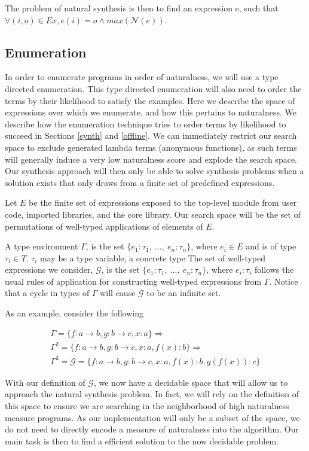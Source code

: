 The problem of natural synthesis is then to find an expression e, such that $\forall (i,o) \in Ex, e (i) = o \land max(\mathcal{N}(e))$.


\subsection{Enumeration}
In order to enumerate programs in order of naturalness, we will use a type directed enumeration.
This type directed enumeration will also need to order the terms by their likelihood to satisfy the examples.
Here we describe the space of expressions over which we enumerate, and how this pertains to naturalness.
We describe how the enumeration technique tries to order terms by likelihood to succeed in Sections \ref{synth} and \ref{offline}.
We can immediately restrict our search space to exclude generated lambda terms (anonymous functions), as such terms will generally induce a very low naturalness score and explode the search space.
Our synthesis approach will then only be able to solve synthesis problems when a solution exists that only draws from a finite set of predefined expressions.

Let $E$ be the finite set of expressions exposed to the top-level module from user code, imported libraries, and the core library.
Our search space will be the set of permutations of well-typed applications of elements of $E$.


A type environment $\Gamma$, is the set $\{e_1 : \tau_1,\ ...,\ e_n : \tau_n\}$, where $e_{i} \in E$ and is of type $\tau_i \in T$.
$\tau_i$ may be a type variable, a concrete type
The set of well-typed expressions we consider, $\mathcal{G}$, is the set $\{e_1 : \tau_1,\ ...,\ e_n : \tau_n\}$, where $e_i : \tau_i$ follows the usual rules of application for constructing well-typed expressions from $\Gamma$.
Notice that a cycle in types of $\Gamma$ will cause $\mathcal{G}$ to be an infinite set.

As an example, consider the following

\begin{gather*}
\Gamma = \{f:a\to b, g:b\to c, x:a\} \Rightarrow \\
\Gamma^2 = \{f:a\to b, g:b\to c, x:a, f(x):b\} \Rightarrow \\
\Gamma^3 = \mathcal{G} = \{f:a\to b, g:b\to c, x:a, f(x):b, g(f(x)):c\}
\end{gather*}

With our definition of $\mathcal{G}$, we now have a decidable space that will allow us to approach the natural synthesis problem.
In fact, we will rely on the definition of this space to ensure we are searching in the neighborhood of high naturalness measure programs.
As our implementation will only be a subset of the space, we do not need to directly encode a measure of naturalness into the algorithm.
Our main task is then to find a efficient solution to the now decidable problem.

